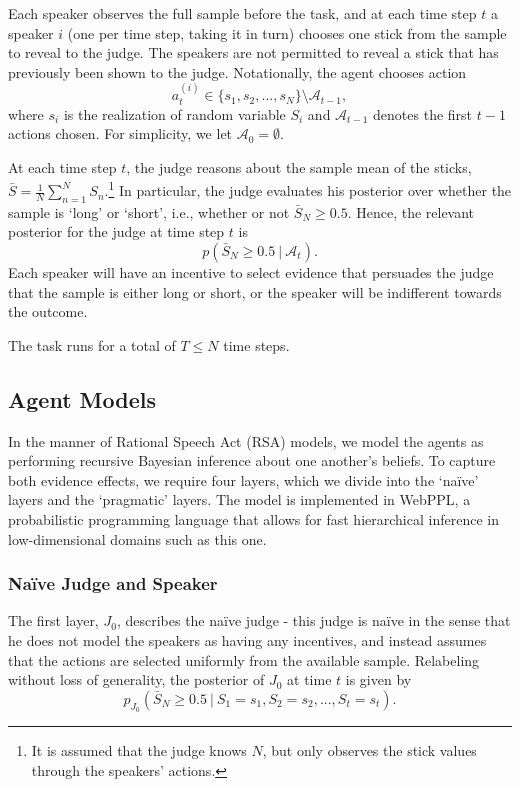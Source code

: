 \documentclass[10pt,letterpaper]{article}
\begin{document}
Each speaker observes the full sample before the task, and at each time step $t$ a speaker
$i$ (one per time step, taking it in turn) chooses one stick from the sample to reveal
to the judge. The speakers are not permitted to reveal a stick that has previously been shown to 
the judge. Notationally, the agent chooses action 
\begin{equation}
a_t^{(i)} \in \{s_1, s_2, ..., s_N\} \setminus \mathcal{A}_{t-1},
\end{equation}
where $s_i$ is the realization of random variable $S_i$ and $\mathcal{A}_{t-1}$ denotes the first
$t-1$ actions chosen. For simplicity, we let $\mathcal{A}_0 = \emptyset$.

At each time step $t$, the judge reasons about the sample mean of the sticks, 
$\bar{S} = \frac{1}{N} \sum_{n=1}^N S_n$.\footnote{It is assumed that the judge knows $N$, but only observes the stick values through the speakers' actions.}
In particular, the judge evaluates his posterior over whether the sample is `long' or `short', i.e., whether or not
$\bar{S	}_N \ge 0.5$. Hence, the relevant posterior for the judge at time step $t$ is
\begin{equation}
p( \bar{S}_N \ge 0.5 \ | \ \mathcal{A}_t ).
\end{equation}
Each speaker will have an incentive to select evidence that persuades the judge that the sample is
either long or short, or the speaker will be indifferent towards the outcome.

The task runs for a total of $T\le N$ time steps.

\subsection{Agent Models}
In the manner of Rational Speech Act (RSA) models, we model the agents as performing
recursive Bayesian inference about one another's beliefs. To capture both evidence effects,
we require four layers, which we divide into the `na\"ive' layers and the `pragmatic' layers.
The model is implemented in WebPPL, a probabilistic programming language that allows for
fast hierarchical inference in low-dimensional domains such as this one.

\subsubsection{Na\"ive Judge and Speaker}
The first layer, $J_0$, describes the na\"ive judge - this judge is na\"ive in the sense that he
does not model the speakers as having any incentives, and instead assumes that the actions are selected
uniformly from the available sample. Relabeling without loss of generality, the posterior of $J_0$ at time $t$ is given by
\begin{equation}
p_{J_0}( \bar{S}_N \ge 0.5 \ | \ S_1=s_1, S_2=s_2, ..., S_t=s_t).
\end{equation}
\end{document}
